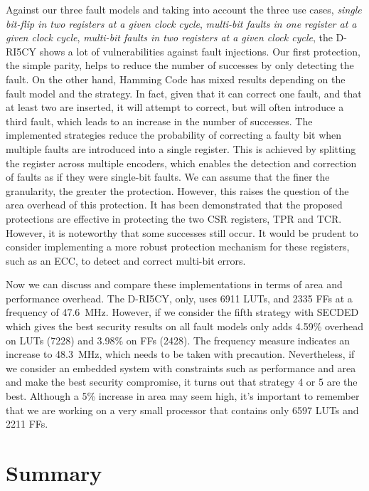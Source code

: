 Against our three fault models and taking into account the three use cases, \textit{single bit-flip in two registers at a given clock cycle}, \textit{multi-bit faults in one register at a given clock cycle}, \textit{multi-bit faults in two registers at a given clock cycle}, the D-RI5CY shows a lot of vulnerabilities against fault injections.
Our first protection, the simple parity, helps to reduce the number of successes by only detecting the fault. On the other hand, Hamming Code has mixed results depending on the fault model and the strategy. In fact, given that it can correct one fault, and that at least two are inserted, it will attempt to correct, but will often introduce a third fault, which leads to an increase in the number of successes. The implemented strategies reduce the probability of correcting a faulty bit when multiple faults are introduced into a single register. This is achieved by splitting the register across multiple encoders, which enables the detection and correction of faults as if they were single-bit faults. We can assume that the finer the granularity, the greater the protection. However, this raises the question of the area overhead of this protection. It has been demonstrated that the proposed protections are effective in protecting the two CSR registers, TPR and TCR. However, it is noteworthy that some successes still occur. It would be prudent to consider implementing a more robust protection mechanism for these registers, such as an ECC, to detect and correct multi-bit errors.

Now we can discuss and compare these implementations in terms of area and performance overhead. The D-RI5CY, only, uses 6911 LUTs, and 2335 FFs at a frequency of \SI{47.6}{\mega\hertz}. However, if we consider the fifth strategy with SECDED which gives the best security results on all fault models only adds 4.59\% overhead on LUTs (7228) and 3.98\% on FFs (2428). The frequency measure indicates an increase to \SI{48.3}{\mega\hertz}, which needs to be taken with precaution.
Nevertheless, if we consider an embedded system with constraints such as performance and area and make the best security compromise, it turns out that strategy 4 or 5 are the best. Although a 5\% increase in area may seem high, it's important to remember that we are working on a very small processor that contains only 6597 LUTs and 2211 FFs.

\section{Summary}

